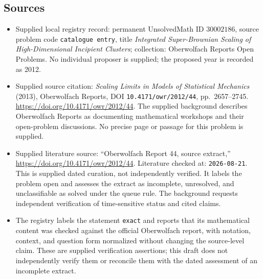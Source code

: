\documentclass[11pt]{article}
\begin{document}
\subsection{Sources}
\begin{itemize}
\item Supplied local registry record: permanent UnsolvedMath ID \(30002186\), source problem code \texttt{catalogue entry}, title \emph{Integrated Super-Brownian Scaling of High-Dimensional Incipient Clusters}; collection: Oberwolfach Reports Open Problems. No individual proposer is supplied; the proposed year is recorded as 2012.
\item Supplied source citation: \emph{Scaling Limits in Models of Statistical Mechanics} (2013), Oberwolfach Reports, DOI \texttt{10.4171/owr/2012/44}, pp.\ 2657--2745. \url{https://doi.org/10.4171/owr/2012/44}. The supplied background describes Oberwolfach Reports as documenting mathematical workshops and their open-problem discussions. No precise page or passage for this problem is supplied.
\item Supplied literature source: ``Oberwolfach Report 44, source extract,'' \url{https://doi.org/10.4171/owr/2012/44}. Literature checked at: \texttt{2026-08-21}. This is supplied dated curation, not independently verified. It labels the problem open and assesses the extract as incomplete, unresolved, and unclassifiable as solved under the queue rule. The background requests independent verification of time-sensitive status and cited claims.
\item The registry labels the statement \texttt{exact} and reports that its mathematical content was checked against the official Oberwolfach report, with notation, context, and question form normalized without changing the source-level claim. These are supplied verification assertions; this draft does not independently verify them or reconcile them with the dated assessment of an incomplete extract.
\end{itemize}
\end{document}
